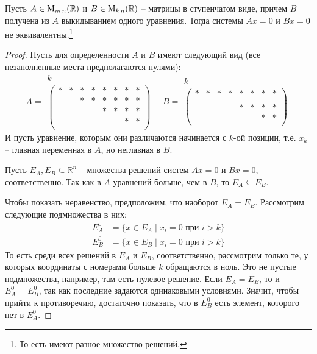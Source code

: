 \begin{claim}
Пусть $A\in\operatorname{M}_{m\,n}(\mathbb R)$ и $B\in\operatorname{M}_{k\,n}(\mathbb R)$ -- матрицы в ступенчатом виде, причем $B$ получена из $A$ выкидыванием одного уравнения. Тогда системы $Ax = 0$ и $Bx = 0$ не эквивалентны.\footnote{То есть имеют разное множество решений.}
\end{claim}
\begin{proof}
Пусть для определенности $A$ и $B$ имеют следующий вид (все незаполненные места предполагаются нулями):
\[
A = 
\begin{matrix}
{k\quad\quad\quad\quad\;}\\
\begin{pmatrix}
{*}&{*}&{*}&{*}&{*}&{*}&{*}&{*}\\
{}&{}&{*}&{*}&{*}&{*}&{*}&{*}\\
{}&{}&{}&{}&{*}&{*}&{*}&{*}\\
{}&{}&{}&{}&{}&{}&{*}&{*}\\
\end{pmatrix}
\end{matrix}
\quad
B =
\begin{matrix}
{k\quad\quad\quad\quad\;}\\
\begin{pmatrix}
{*}&{*}&{*}&{*}&{*}&{*}&{*}&{*}\\
{}&{}&{}&{}&{}&{}&{}&{}\\
{}&{}&{}&{}&{*}&{*}&{*}&{*}\\
{}&{}&{}&{}&{}&{}&{*}&{*}\\
\end{pmatrix}
\end{matrix}
\]
И пусть уравнение, которым они различаются начинается с $k$-ой позиции, т.е. $x_k$ -- главная переменная в $A$, но неглавная в $B$.

Пусть $E_A, E_B\subseteq \mathbb R^n$ -- множества решений систем $Ax = 0$ и $Bx = 0$, соответственно. Так как в $A$ уравнений больше, чем в $B$, то $E_A \subseteq E_B$. 

Чтобы показать неравенство, предположим, что наоборот $E_A = E_B$. Рассмотрим следующие подмножества в них:
\begin{align*}
E_A^0 &= \{x\in E_A\mid x_i = 0\text{ при }i>k\}\\
E_B^0 &= \{x\in E_B\mid x_i = 0\text{ при }i>k\}
\end{align*}
То есть среди всех решений в $E_A$ и $E_B$, соответственно, рассмотрим только те, у которых координаты с номерами больше $k$ обращаются в ноль. Это не пустые подмножества, например, там есть нулевое решение. Если $E_A = E_B$, то и $E_A^0 = E_B^0$, так как последние задаются одинаковыми условиями. Значит, чтобы прийти к противоречию, достаточно показать, что в $E_B^0$ есть элемент, которого нет в $E_A^0$. 


\end{proof}
